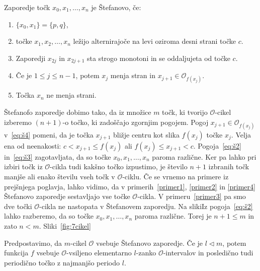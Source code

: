 \documentclass[mat2]{fmfdelo}
\begin{document}
\begin{definicija}
Zaporedje točk $x_0, x_1, \dots, x_n$ je Štefanovo, če:

  \begin{enumerate}[label={(Š\arabic*)}]
    \item $\{x_0, x_1\} = \{p, q\}$, \label{eq:š1}
    \item točke $x_1, x_2, \dots, x_n$ ležijo alternirajoče na levi oziroma desni strani točke $c$. \label{eq:š2}
    \item Zaporedji $x_{2j}$ in $x_{2j+1}$ sta strogo monotoni in se oddaljujeta od točke $c$. \label{eq:š3}
    \item Če je $1\leq j \leq n-1$, potem $x_j$ menja stran in $x_{j+1} \in \mathcal{O}_{f(x_j)}$.\label{eq:š4}
    \item Točka $x_n$ ne menja strani. \label{eq:š5}
  \end{enumerate}
  
\end{definicija}
\begin{opomba}
Štefanofo zaporedje dobimo tako, da iz množice $m$ točk, ki tvorijo $\mathcal{O}$-cikel izberemo $(n+1)$-o točko, ki zadoščajo zgornjim pogojem. 
Pogoj $x_{j+1} \in \mathcal{O}_{f(x_j)}$ v~\ref{eq:š4} pomeni, da je točka $x_{j+1}$ bližje centru kot slika $f(x_j)$ točke $x_j$. Velja ena od neenakosti: $c < x_{j+1} \leq f(x_j)$ ali $f(x_j) \leq x_{j+1} < c$. 
Pogoja~\ref{eq:š2} in~\ref{eq:š3} zagotavljata, da so točke $x_0, x_1, \dots, x_n$ paroma različne. Ker pa lahko pri izbiri točk iz $\mathcal{O}$-cikla tudi kakšno točko izpustimo, je število $n+1$ izbranih točk manjše ali enako številu vseh točk v $\mathcal{O}$-ciklu. Če se vrnemo na primere iz prejšnjega poglavja, lahko vidimo, da v primerih~\ref{primer1}, \ref{primer2} in \ref{primer4} Štefanovo zaporedje sestavljajo vse točke $\mathcal{O}$-cikla. V primeru~\ref{primer3} pa smo dve točki $\mathcal{O}$-cikla ne nastopata v Štefanovem zaporedju.
 Na slikiIz pogoja~\ref{eq:š2} lahko razberemo, da so točke $x_0, x_1, \dots, x_n$ paroma različne. Torej je $n+1 \leq m$ in zato $n<m$. Sliki~\ref{fig:7cikel}
\end{opomba}

\begin{trditev}\label{trd:zap-cikel}
Predpostavimo, da $m$-cikel $\mathcal{O}$ vsebuje Štefanovo zaporedje. Če je $l \triangleleft m$, potem funkcija $f$ vsebuje $\mathcal{O}$-vsiljeno elementarno $l$-zanko $\mathcal{O}$-intervalov in posledično tudi periodično točko z najmanjšo periodo $l$.
\end{trditev}
\end{document}
